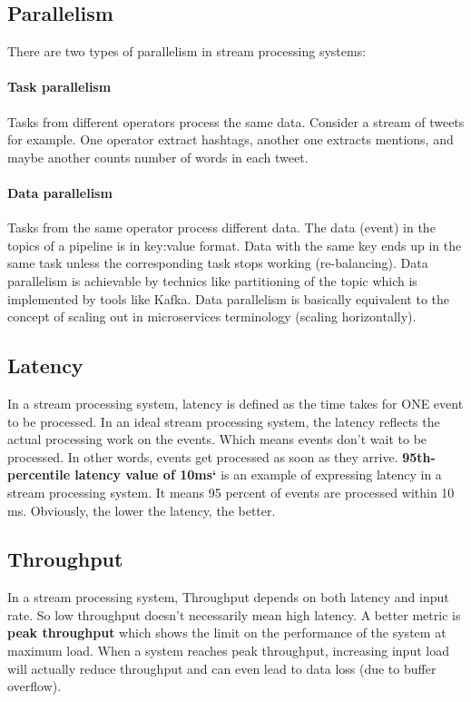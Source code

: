 \documentclass[a4]{report}
\begin{document}
    \subsection{Parallelism}
    There are two types of parallelism in stream processing systems:

    \paragraph{Task parallelism}
    Tasks from different operators process the same data.
    Consider a stream of tweets for example.
    One operator extract hashtags, another one extracts mentions, and maybe another counts number of words in each
    tweet.

    \paragraph{Data parallelism}
    Tasks from the same operator process different data.
    The data (event) in the topics of a pipeline is in key:value format.
    Data with the same key ends up in the same task unless the corresponding task stops working (re-balancing).
    Data parallelism is achievable by technics like partitioning of the topic which is implemented by tools like Kafka.
    Data parallelism is basically equivalent to the concept of scaling out in microservices terminology (scaling horizontally).

    \subsection{Latency}
    In a stream processing system, latency is defined as the time takes for ONE event to be processed.
    In an ideal stream processing system, the latency reflects the actual processing work on the events.
    Which means events don't wait to be processed.
    In other words, events get processed as soon as they arrive.
    \textbf{95th-percentile latency value of 10ms`} is an example of expressing latency in a stream processing system.
    It means 95 percent of events are processed within 10 ms.
    Obviously, the lower the latency, the better.

    \subsection{Throughput}
    In a stream processing system, Throughput depends on both latency and input rate.
    So low throughput doesn't necessarily mean high latency.
    A better metric is \textbf{peak throughput} which shows the limit on the performance of the system at maximum load.
    When a system reaches peak throughput, increasing input load will actually reduce throughput and can even lead to
    data loss (due to buffer overflow).
\end{document}
